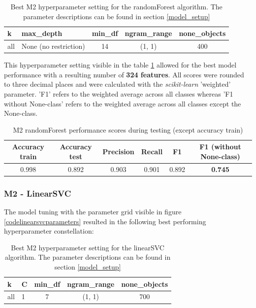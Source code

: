 \begin{table}[h!]
\begin{center}
\caption{Best M2 hyperparameter setting for the randomForest algorithm. The parameter descriptions can be found in section \ref{model_setup}}\vspace{1ex}
\label{tab:m2_randomForest_bestParams}
\begin{tabular}{llccc}\hline
k & max\_depth & min\_df & ngram\_range & none\_objects \\ \hline
all & None (no restriction) & 14 & (1, 1) & 400 \\ \hline
\end{tabular}
\end{center}
\end{table}

This hyperparameter setting visible in the table \ref{tab:m2_randomForest_bestParams} allowed for the best model performance with a resulting number of \textbf{324 features}. All scores were rounded to three decimal places and were calculated with the \textit{scikit-learn} 'weighted' parameter. 'F1' refers to the weighted average across all classes whereas 'F1 without None-class' refers to the weighted average across all classes except the None-class.

\begin{table}[h!]
\begin{center}
\caption{M2 randomForest performance scores during testing (except accuracy train)}\vspace{1ex}
\label{tab:m2_randomForest_bestscores}
\begin{tabular}{cccccc}\hline
Accuracy train & Accuracy test & Precision & Recall & F1 & F1 (without None-class)\\ \hline
0.998 & 0.892 & 0.903 & 0.901 & 0.892 & \textbf{0.745}\\ \hline
\end{tabular}
\end{center}
\end{table}

\subsubsection*{M2 - LinearSVC}
The model tuning with the parameter grid visible in figure \ref{codelinearsvcparameters} resulted in the following best performing hyperparameter constellation:

\begin{table}[h!]
\begin{center}
\caption{Best M2 hyperparameter setting for the linearSVC algorithm. The parameter descriptions can be found in section \ref{model_setup}}\vspace{1ex}
\label{tab:m2_linearSVC_bestParams}
\begin{tabular}{llccc}\hline
k & C & min\_df & ngram\_range & none\_objects \\ \hline
all & 1 & 7 & (1, 1) & 700 \\ \hline
\end{tabular}
\end{center}
\end{table}

